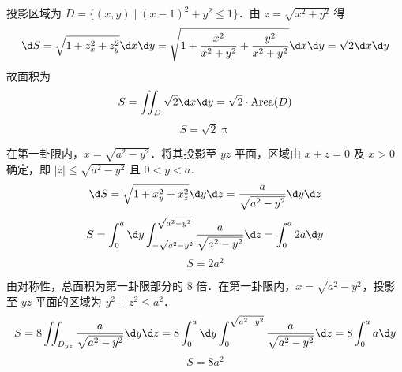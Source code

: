 \begin{solution}

    投影区域为 $D = \{(x, y) \mid (x-1)^2 + y^2 \le 1\}$．由 $z = \sqrt{x^2+y^2}$ 得
    \begin{equation}
        \d S = \sqrt{1 + z_x^2 + z_y^2} \d x \d y = \sqrt{1 + \frac{x^2}{x^2+y^2} + \frac{y^2}{x^2+y^2}} \d x \d y = \sqrt{2} \d x \d y
    \end{equation}
    故面积为
    \begin{equation}
        S = \iint_D \sqrt{2} \d x \d y = \sqrt{2} \cdot \operatorname{Area}(D)
    \end{equation}
    \begin{equation}
        \boxed{S = \sqrt{2} \uppi}
    \end{equation}


    在第一卦限内，$x = \sqrt{a^2-y^2}$．将其投影至 $yz$ 平面，区域由 $x \pm z = 0$ 及 $x>0$ 确定，即 $|z| \le \sqrt{a^2-y^2}$ 且 $0 < y < a$．
    \begin{equation}
        \d S = \sqrt{1 + x_y^2 + x_z^2} \d y \d z = \frac{a}{\sqrt{a^2-y^2}} \d y \d z
    \end{equation}
    \begin{equation}
        S = \int_0^a \d y \int_{-\sqrt{a^2-y^2}}^{\sqrt{a^2-y^2}} \frac{a}{\sqrt{a^2-y^2}} \d z = \int_0^a 2a \d y
    \end{equation}
    \begin{equation}
        \boxed{S = 2a^2}
    \end{equation}


    由对称性，总面积为第一卦限部分的 $8$ 倍．在第一卦限内，$x = \sqrt{a^2-y^2}$，投影至 $yz$ 平面的区域为 $y^2 + z^2 \le a^2$．
    \begin{equation}
        S = 8 \iint_{D_{yz}} \frac{a}{\sqrt{a^2-y^2}} \d y \d z = 8 \int_0^a \d y \int_0^{\sqrt{a^2-y^2}} \frac{a}{\sqrt{a^2-y^2}} \d z = 8 \int_0^a a \d y
    \end{equation}
    \begin{equation}
        \boxed{S = 8a^2}
    \end{equation}



\end{solution}
